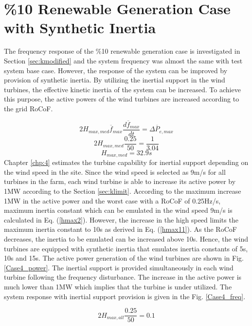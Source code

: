 \section{\%10 Renewable Generation Case with Synthetic Inertia}
The frequency response of the \%10 renewable generation case is investigated in Section \ref{sec:kmodified} and the system frequency was almost the same with test system base case. However, the response of the system can be improved by provision of synthetic inertia. By utilizing the inertial support in the wind turbines, the effective kinetic inertia of the system can be increased. To achieve this purpose, the active powers of the wind turbines are increased according to the grid RoCoF. \par
\begin{equation}
\label{hmax}
2H_{max,med}\overline{f}_{max}\frac{d\overline{f}_{max}}{dt}=\Delta\overline{P}_{e,max}
\end{equation}
\begin{equation}
\label{hmax1}
2H_{max,med}\frac{0.25}{50}=\frac{1}{3.04}
\end{equation}
\begin{equation}
\label{hmax2}
H_{max,med}=32.9s
\end{equation}
Chapter \ref{chp:4} estimates the turbine capability for inertial support depending on the wind speed in the site. Since the wind speed is selected as 9m/s for all turbines in the farm, each wind turbine is able to increase its active power by 1MW according to the Section \ref{sec:klimit}. According to the maximum increase 1MW in the active power and the worst case with a RoCoF of 0.25Hz/s, maximum inertia constant which can be emulated in the wind speed 9m/s is calculated in Eq. (\ref{hmax2}). However, the increase in the high speed limits the maximum inertia constant to 10s as derived in Eq. (\ref{hmax11}). As the RoCoF decreases, the inertia to be emulated can be increased above 10s. Hence, the wind turbines are equipped with synthetic inertia that emulates inertia constants of 5s, 10s and 15s. The active power generation of the wind turbines are shown in Fig. \ref{Case4_power}. The inertial support is provided simultaneously in each wind turbine following the frequency disturbance. The increase in the active power is much lower than 1MW which implies that the turbine is under utilized. The system response with inertial support provision is given in the Fig. \ref{Case4_freq}.\par
\begin{equation}
\label{hmax11}
2H_{max,all}\frac{0.25}{50}=0.1
\end{equation}
